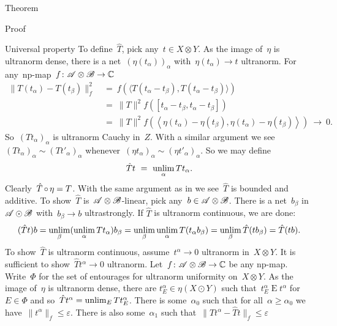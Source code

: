 \documentclass[b]{subfiles}
\begin{document}
\begin{parsec}
\begin{point}{Theorem}
\begin{point}{Proof}
\begin{point}{Universal property}
To define~$\hat{T}$, pick any~$t \in X \otimes Y$.
As the image of~$\eta$ is ultranorm dense,
there is a net~$(\eta(t_\alpha))_\alpha$ with~$\eta(t_\alpha) \to t$ ultranorm.
For any~np-map~$f\colon \mathscr{A}\otimes \mathscr{B} \to \mathbb{C}$
\begin{align*}
    \|T(t_\alpha) - T(t_\beta) \|_f^2 
        &\ =\ f(\langle T(t_\alpha - t_\beta), T(t_\alpha - t_\beta) \rangle) \\
        & \ = \ \|T\|^2 f([t_\alpha-t_\beta, t_\alpha - t_\beta]) \\
        & \ = \ \|T\|^2 f(\left<\eta (t_\alpha)-\eta(t_\beta), \eta(t_\alpha) - \eta(t_\beta)\right>) \ \to\  0.
\end{align*}
So~$(T t_\alpha)_\alpha$ is ultranorm Cauchy in~$Z$.
With a similar argument we see~$(Tt_\alpha)_\alpha \sim (T t'_\alpha)_\alpha$
whenever~$(\eta t_\alpha)_\alpha \sim (\eta t'_\alpha)_\alpha$.
So we may define
\begin{equation*}
\hat{T} t \ = \ \unlim_\alpha T t_\alpha.
\end{equation*}
Clearly~$\hat{T} \mathop{\circ} \eta = T$.
With the same argument as in 
    we see~$\hat{T}$ is bounded and additive.
To show~$\hat{T}$ is~$\mathscr{A}\otimes \mathscr{B}$-linear,
    pick any~$b \in \mathscr{A} \otimes \mathscr{B}$.
There is a net~$b_\beta$ in~$\mathscr{A} \odot \mathscr{B}$
    with~$b_\beta \to b$ ultrastrongly.
If $\hat{T}$ is ultranorm continuous, we are done:
\begin{equation*}
    (\hat{T} t) b
    = \unlim_\beta (\unlim_\alpha T t_\alpha) b_\beta\\
     = \unlim_\beta \unlim_\alpha T (t_\alpha b_\beta) \\
     = \unlim_\beta \hat{T} (t b_\beta)\\
     = \hat{T} (tb).
\end{equation*}
To show~$\hat{T}$ is ultranorm continuous,
    assume~$t^\alpha \to 0$ ultranorm in~$X \otimes Y$.
It is sufficient to show~$\hat{T} t^\alpha \to 0$ ultranorm.
Let~$f\colon \mathscr{A}\otimes \mathscr{B} \to \mathbb{C}$ be any np-map.
Write~$\Phi$ for the set of entourages for ultranorm uniformity
    on~$X \otimes Y$.
As the image of~$\eta$ is ultranorm dense,
there are $t^\alpha_E \in \eta(X \odot Y)$
    such that~$t^\alpha_E \mathrel{E} t^\alpha$ for~$E \in \Phi$
    and so~$\hat{T} t^\alpha = \unlim_E T t^\alpha_E$.
There is some~$\alpha_0$
    such that for all~$\alpha \geq \alpha_0$
    we have~$\|t^\alpha \|_f \leq \varepsilon$.
There is also some~$\alpha_1$
    such that~$\|\hat{T} t^\alpha - \hat{T} t\|_f \leq \varepsilon$

\end{point}
\end{point}
\end{point}
\end{parsec}
\end{document}
